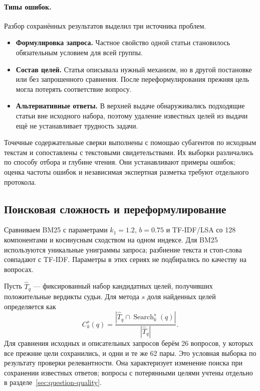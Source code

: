 \paragraph{Типы ошибок.}
Разбор сохранённых результатов выделил три источника проблем.
\begin{itemize}
    \item \textbf{Формулировка запроса.} Частное свойство одной статьи становилось обязательным условием для всей группы.
    \item \textbf{Состав целей.} Статья описывала нужный механизм, но в другой постановке или без запрошенного сравнения. После переформулирования прежняя цель могла потерять соответствие вопросу.
    \item \textbf{Альтернативные ответы.} В верхней выдаче обнаруживались подходящие статьи вне исходного набора, поэтому удаление известных целей из выдачи ещё не устанавливает трудность задачи.
\end{itemize}
Точечные содержательные сверки выполнены с помощью субагентов по исходным текстам и сопоставлены с текстовыми свидетельствами. Их выборки различались по способу отбора и глубине чтения. Они устанавливают примеры ошибок; оценка частоты ошибок и независимая экспертная разметка требуют отдельного протокола.

\subsection{Поисковая сложность и переформулирование}\label{sec:retrieval}

Сравниваем BM25 с параметрами $k_1=1.2$, $b=0.75$ и TF-IDF/LSA со 128 компонентами и косинусным сходством на одном индексе. Для BM25 используются уникальные униграммы запроса; разбиение текста и стоп-слова совпадают с TF-IDF. Параметры в этих сериях не подбирались по качеству на вопросах.

Пусть $\widehat T_q$ --- фиксированный набор кандидатных целей, получивших положительные вердикты судьи. Для метода $s$ доля найденных целей определяется как
\[
C_k^s(q)=\frac{|\widehat T_q\cap\operatorname{Search}_k^s(q)|}{|\widehat T_q|}.
\]
Для сравнения исходных и описательных запросов берём 26 вопросов, у которых все прежние цели сохранились, и одни и те же 62 пары. Это условная выборка по результату проверки релевантности. Она характеризует изменение поиска при сохранении известных ответов; вопросы с потерянными целями учтены отдельно в разделе~\ref{sec:question-quality}.

